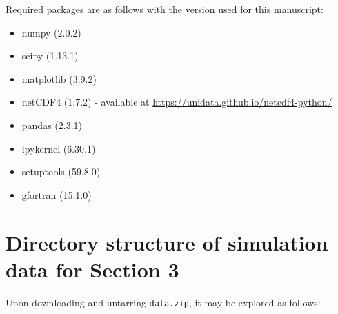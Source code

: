\documentclass[gmd,manuscript]{copernicus}
\begin{document}
Required packages are as follows with the version used for this manuscript:
\begin{itemize}
\item numpy (2.0.2)
\item scipy (1.13.1)
\item matplotlib (3.9.2)
\item netCDF4 (1.7.2) - available at \url{https://unidata.github.io/netcdf4-python/}
\item pandas (2.3.1)
\item ipykernel (6.30.1)
\item setuptools (59.8.0)
\item gfortran (15.1.0)
\end{itemize}


\section*{Directory structure of simulation data for Section 3}

Upon downloading and untarring \texttt{data.zip}, it may be explored as follows:
\end{document}
